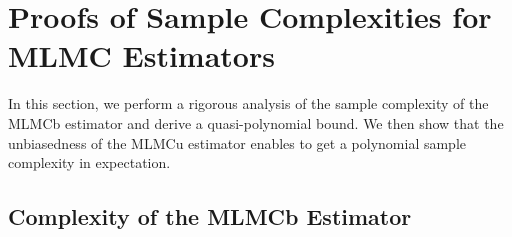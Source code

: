\documentclass[11pt]{article}
\numberwithin{equation}{section}
\theoremstyle{definition}
\theoremstyle{remark}
\begin{document}
\section{Proofs of  Sample Complexities   for MLMC Estimators}

\label{section:analysis-of-the-complexity}
In this section, we perform a rigorous analysis of the sample complexity of the MLMCb estimator and derive a quasi-polynomial bound. We then show that the unbiasedness of the MLMCu estimator enables to get a polynomial sample complexity in expectation.

\subsection{Complexity of the MLMCb Estimator}
\label{subsection:specialising-complexity-plainMC}
\end{document}
